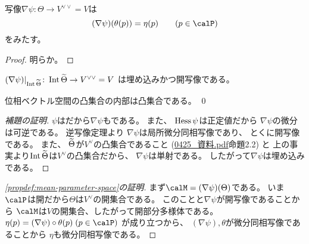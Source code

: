 \documentclass[report]{jlreq}
\begin{document}
\begin{lemma}
    写像$\nabla \psi \colon \Theta \to V^{\vee\vee} = V$は
    \begin{equation}
        (\nabla \psi)(\theta(p))
            =
                \eta(p)
                \qquad
                (p \in \calP)
    \end{equation}
    をみたす。
\end{lemma}

\begin{proof}
    明らか。
\end{proof}

\begin{lemma}
    $(\nabla \psi)|_{\operatorname{Int} \widetilde{\Theta}}
        \colon \operatorname{Int} \widetilde{\Theta} \to V^{\vee\vee} = V$
    は{\smooth}埋め込みかつ開写像である。
\end{lemma}

\begin{fact}
    位相ベクトル空間の凸集合の内部は凸集合である。
    \qed
\end{fact}

\begin{proof}[補題の証明]
    $\psi$は{\smooth}だから$\nabla \psi$も{\smooth}である。
    また、
    $\operatorname{Hess} \psi$は正定値だから
    $\nabla \psi$の微分は可逆である。
    逆写像定理より
    $\nabla \psi$は局所微分同相写像であり、
    とくに開写像である。
    また、
    $\widetilde{\Theta}$が$V^\vee$の凸集合であること (\url{0425_資料.pdf}命題2.2) と
    上の事実より$\operatorname{Int} \widetilde{\Theta}$は$V^\vee$の凸集合だから、
    $\nabla \psi$は単射である。
    したがって$\nabla \psi$は埋め込みである。
\end{proof}

\begin{proof}[\cref{propdef:mean-parameter-space}の証明]
    まず$\calM = (\nabla \psi)(\Theta)$である。
    いま$\calP$は開だから$\Theta$は$V^\vee$の開集合である。
    このことと$\nabla \psi$が開写像であることから
    $\calM$は$V$の開集合、したがって開部分多様体である。
    $\eta(p) = (\nabla \psi) \circ \theta(p) \; (p \in \calP)$
    が成り立つから、
    $(\nabla \psi), \theta$が微分同相写像であることから
    $\eta$も微分同相写像である。
\end{proof}
\end{document}
